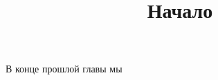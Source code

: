 \documentclass{article}
\begin{document}


\title{\textbf{\Huge Начало}}
\author{}
\date{}

\maketitle %

В конце прошлой главы мы 
\end{document}
